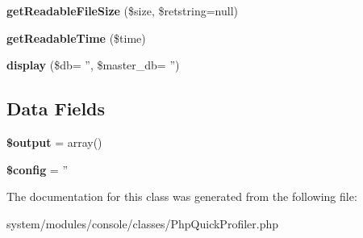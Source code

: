 \begin{DoxyCompactItemize}
\item 
\hypertarget{class_php_quick_profiler_abf52ddc25c22f32bf428066a4bcf61ef}{
{\bfseries getReadableFileSize} (\$size, \$retstring=null)}
\label{class_php_quick_profiler_abf52ddc25c22f32bf428066a4bcf61ef}

\item 
\hypertarget{class_php_quick_profiler_a54b1dbe09daf72a170db3617a84ca391}{
{\bfseries getReadableTime} (\$time)}
\label{class_php_quick_profiler_a54b1dbe09daf72a170db3617a84ca391}

\item 
\hypertarget{class_php_quick_profiler_a727524672a3f30ee2868b1344e856866}{
{\bfseries display} (\$db= '', \$master\_\-db= '')}
\label{class_php_quick_profiler_a727524672a3f30ee2868b1344e856866}

\end{DoxyCompactItemize}
\subsection*{Data Fields}
\begin{DoxyCompactItemize}
\item 
\hypertarget{class_php_quick_profiler_a73004ce9cd673c1bfafd1dc351134797}{
{\bfseries \$output} = array()}
\label{class_php_quick_profiler_a73004ce9cd673c1bfafd1dc351134797}

\item 
\hypertarget{class_php_quick_profiler_a49c7011be9c979d9174c52a8b83e5d8e}{
{\bfseries \$config} = ''}
\label{class_php_quick_profiler_a49c7011be9c979d9174c52a8b83e5d8e}

\end{DoxyCompactItemize}


The documentation for this class was generated from the following file:\begin{DoxyCompactItemize}
\item 
system/modules/console/classes/PhpQuickProfiler.php\end{DoxyCompactItemize}
